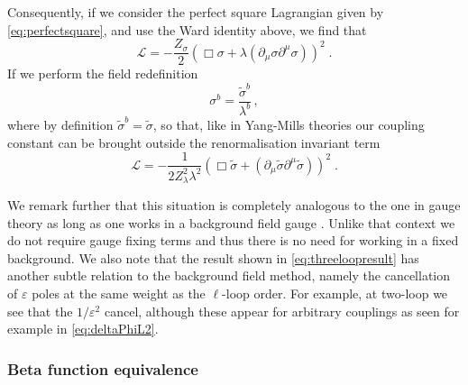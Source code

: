\documentclass[a4paper,11pt]{article}
\begin{document}
Consequently, if we consider the perfect square Lagrangian given by \cref{eq:perfectsquare}, and use the Ward identity above, we find that
\begin{equation}
    \mathcal{L}   = -\frac{Z_\sigma}{2}\left(\Box \sigma + \lambda (\partial_\mu \sigma \partial^\mu \sigma)\right)^2\;.
\end{equation}
If we perform the field redefinition
\begin{equation}
   \sigma^b  = \frac{\tilde{\sigma}^b}{\lambda^b} \,,
\end{equation}
where by definition $\tilde{\sigma}^b = \tilde{\sigma}$, so that, like in Yang-Mills theories our coupling constant can be brought outside the renormalisation invariant term
\begin{equation}
    \mathcal{L}   = - \frac{1}{2Z_\lambda^2\lambda^2}( \Box \tilde{\sigma} +  (\partial_\mu \tilde{\sigma}\partial^\mu \tilde{\sigma}))^2\;.
\end{equation}

We remark further that this situation is completely analogous to the one in gauge theory as long as one works in a background field gauge \cite{Abbott:1981ke}. Unlike that context we do not require gauge fixing terms and thus there is no need for working in a fixed background. We also note that the result shown in \cref{eq:threeloopresult} has another subtle relation to the background field method, namely the cancellation of $\varepsilon$ poles at the same weight as the $\ell$-loop order. For example, at two-loop we see that the $1/\varepsilon^2$ cancel, although these appear for arbitrary couplings as seen for example in \cref{eq:deltaPhiL2}.


\subsubsection{Beta function equivalence}\label{sec:betafunsequivalence}
\end{document}
